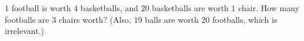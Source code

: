 $1$ football is worth $4$ basketballs, and $20$ basketballs are worth $1$ chair. How many footballs are $3$ chairs worth? (Also, $19$ balls are worth $20$ footballs, which is irrelevant.)
